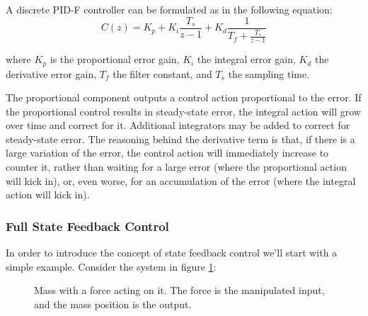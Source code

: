 \documentclass[  10pt, twoside]{report} %
\numberwithin{equation}{chapter}
\begin{document}
A discrete PID-F controller can be formulated as in the following equation:
\begin{equation}
    C(z) =  K_p + K_i \frac{T_s}{z-1} + K_d \frac{1}{T_f + \frac{T_s}{z-1}} 
\end{equation}

where $K_p$ is the proportional error gain, $K_i$ the integral error gain, $K_d$ the derivative error gain, $T_f$ the filter constant, and $T_s$ the sampling time.

The proportional component outputs a control action proportional to the error. If the proportional control results in steady-state error, the integral action will grow over time and correct for it. Additional integrators may be added to correct for steady-state error. The reasoning behind the derivative term is that, if there is a large variation of the error, the control action will immediately increase to counter it, rather than waiting for a large error (where the proportional action will kick in), or, even worse, for an accumulation of the error (where the integral action will kick in).


\subsubsection{Full State Feedback Control}
In order to introduce the concept of state feedback control we'll start with a simple example. Consider the system in figure \ref{tikz_StateFeedbackControl_intro}:
\begin{figure}[H]
    \centering
    \caption{Mass with a force acting on it. The force is the manipulated input, and the mass position is the output.} \label{tikz_StateFeedbackControl_intro}
\end{figure}
\end{document}
